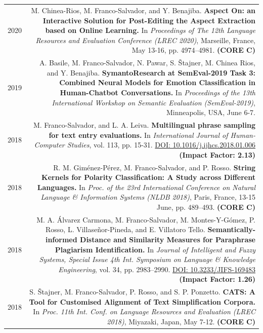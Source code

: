 \documentclass[10pt]{article}
\begin{document}
\section*{}
\begin{tabular}{L!{\VRule}R}
	2020 & M. Chinea-Rios, M. Franco-Salvador, and Y. Benajiba. \textbf{Aspect On: an Interactive Solution for Post-Editing the Aspect Extraction based on Online Learning.}
	In \emph{Proceedings of The 12th Language Resources and Evaluation Conference (LREC 2020)}, Marseille, France, May 13-16, pp. 4974--4981. 	\textbf{(CORE C)}\vspace{5pt}\\	
	2019 & A. Basile, M. Franco-Salvador, N. Pawar, S. \v{S}tajner, M. Chinea Rios, and Y. Benajiba. \textbf{SymantoResearch at SemEval-2019 Task 3: Combined Neural Models for Emotion Classification in Human-Chatbot Conversations.}
	In \emph{Proceedings of the 13th International Workshop on Semantic Evaluation (SemEval-2019)}, Minneapolis, USA, June 6-7.\vspace{5pt}\\	
	2018 & M. Franco-Salvador, and L. A. Leiva. \textbf{Multilingual phrase sampling for text entry evaluations.}
	In \emph{International Journal of Human-Computer Studies}, vol. 113, pp. 15-31. \href{https://doi.org/10.1016/j.ijhcs.2018.01.006}{DOI: 10.1016/j.ijhcs.2018.01.006} \textbf{(Impact Factor: 2.13)} \vspace{5pt}\\	
	2018& R. M. Gim{\'e}nez-P{\'e}rez, M. Franco-Salvador, and P. Rosso. \textbf{String Kernels for Polarity Classification: A Study across Different Languages.}
	In \emph{Proc. of the 23rd International Conference on Natural Language \& Information Systems (NLDB 2018)}, Paris, France, 13-15 June, pp. 489--493. \textbf{(CORE C)}\vspace{5pt}\\
	2018&M. A. {\'A}lvarez Carmona,  M. Franco-Salvador, M. Montes-Y-G{\'o}mez, P. Rosso, L. Villase{\~n}or-Pineda, and E. Villatoro Tello. \textbf{Semantically-informed Distance and Similarity Measures for Paraphrase Plagiarism Identification.}
	In \emph{Journal of Intelligent and Fuzzy Systems, Special Issue 4th Int. Symposium on Language \& Knowledge Engineering}, vol. 34, pp. 2983--2990. \href{https://doi.org/10.3233/JIFS-169483}{DOI: 10.3233/JIFS-169483} \textbf{(Impact Factor: 1.26)} \vspace{5pt}\\	
	2018 & S. \v{S}tajner, M. Franco-Salvador, P. Rosso, and S. P. Ponzetto. \textbf{CATS: A Tool for Customised Alignment of Text Simplification Corpora.} In \emph{Proc. 11th Int. Conf. on Language Resources and Evaluation (LREC 2018)}, Miyazaki, Japan, May 7-12. \textbf{(CORE C)} \vspace{5pt}\\

\end{tabular}
\end{document}
